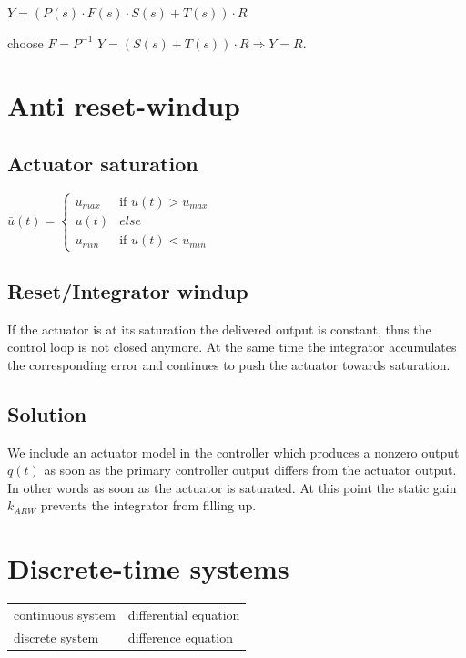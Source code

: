 \documentclass[10pt,a4paper]{scrartcl}
\begin{document}
\begin{multicols*}{3}
	$Y=(P(s)\cdot F(s)\cdot S(s)+T(s))\cdot R$ 
	
	\dahe choose $F=P^{-1}$ \dahe $Y=(S(s)+T(s))\cdot R \Rightarrow Y=R$.
	
	\section{Anti reset-windup}
	
	\subsection*{Actuator saturation}
	
	
	$\bar{u}(t)=\begin{cases}u_{max}& \text{if }u(t)>u_{max}\\
	u(t)&else\\
	u_{min}&\text{if }u(t)<u_{min}\end{cases}$
	
	\subsection*{Reset/Integrator windup}
	
	If the actuator is at its saturation the delivered output is constant, thus the control loop is not closed anymore. At the same time the integrator accumulates the corresponding error and continues to push the actuator towards saturation.
	
	\subsection*{Solution}
	
	
	We include an actuator model in the controller which produces a nonzero output $q(t)$ as soon as the primary controller output differs from the actuator output. In other words as soon as the actuator is saturated. At this point the static gain $k_{ARW}$ prevents the integrator from filling up.	

	\columnbreak
	
	\section{Discrete-time systems}
	
	\begin{tabular}{l@{\dahe}l}
	continuous system&differential equation\\
	discrete system&difference equation
	\end{tabular}
	

\end{multicols*}
\end{document}
